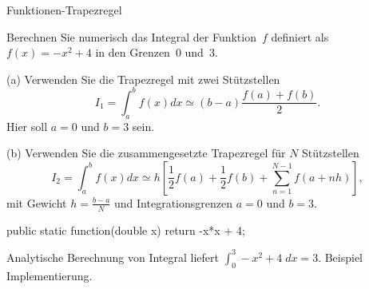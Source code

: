 \begin{exercise}{Funktionen-Trapezregel}
\begin{body}
Berechnen Sie numerisch das Integral der Funktion~$f$ definiert als $f(x) = -x^2+4$ in den Grenzen~$0$ und~$3$.

\begin{parts}
\item[(a)] Verwenden Sie die Trapezregel mit zwei St\"utzstellen
\[
I_1
= \int_a^b f(x)dx
\simeq (b-a)\frac{f(a)+f(b)}{2}
.\]
Hier soll $a=0$ und $b=3$ sein.
\item[(b)] Verwenden Sie die zusammengesetzte Trapezregel f\"ur $N$ St\"utzstellen
\[
I_2
= \int_a^b f(x)dx
\simeq h \left[\frac{1}{2}f(a)+\frac{1}{2}f(b)+\sum_{n=1}^{N-1}f\left(a+nh \right)\right]
,\]
mit Gewicht $h = \frac{b-a}{N}$ und Integrationsgrenzen $a=0$ und $b=3$.

\begin{displaycode}
public static function(double x) {
  return -x*x + 4;
}
\end{displaycode}
\end{parts}

\end{body}


\begin{solution}
Analytische Berechnung von Integral liefert $\int_0^3 -x^2 +4 \; dx = 3$.
Beispiel Implementierung.
\end{solution}

\end{exercise}
